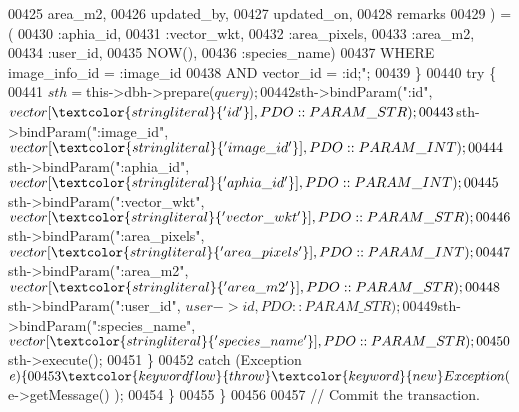 \begin{DoxyCode}
{00425 \textcolor{stringliteral}{                        area\_m2,}
00426 \textcolor{stringliteral}{                        updated\_by,}
00427 \textcolor{stringliteral}{                        updated\_on,}
00428 \textcolor{stringliteral}{                        remarks}
00429 \textcolor{stringliteral}{                    ) = (}
00430 \textcolor{stringliteral}{                        :aphia\_id,}
00431 \textcolor{stringliteral}{                        :vector\_wkt,}
00432 \textcolor{stringliteral}{                        :area\_pixels,}
00433 \textcolor{stringliteral}{                        :area\_m2,}
00434 \textcolor{stringliteral}{                        :user\_id,}
00435 \textcolor{stringliteral}{                        NOW(),}
00436 \textcolor{stringliteral}{                        :species\_name)}
00437 \textcolor{stringliteral}{                    WHERE image\_info\_id = :image\_id}
00438 \textcolor{stringliteral}{                        AND vector\_id = :id;"};
00439             \}
00440             \textcolor{keywordflow}{try} \{
00441                 $sth = $this->dbh->prepare($query);
00442                 $sth->bindParam(\textcolor{stringliteral}{":id"}, $vector[\textcolor{stringliteral}{'id'}], PDO::PARAM\_STR);
00443                 $sth->bindParam(\textcolor{stringliteral}{":image\_id"}, $vector[\textcolor{stringliteral}{'image\_id'}], 
      PDO::PARAM\_INT);
00444                 $sth->bindParam(\textcolor{stringliteral}{":aphia\_id"}, $vector[\textcolor{stringliteral}{'aphia\_id'}], 
      PDO::PARAM\_INT);
00445                 $sth->bindParam(\textcolor{stringliteral}{":vector\_wkt"}, $vector[\textcolor{stringliteral}{'vector\_wkt'}], 
      PDO::PARAM\_STR);
00446                 $sth->bindParam(\textcolor{stringliteral}{":area\_pixels"}, $vector[\textcolor{stringliteral}{'area\_pixels'}], 
      PDO::PARAM\_INT);
00447                 $sth->bindParam(\textcolor{stringliteral}{":area\_m2"}, $vector[\textcolor{stringliteral}{'area\_m2'}], PDO::PARAM\_STR)
      ;
00448                 $sth->bindParam(\textcolor{stringliteral}{":user\_id"}, $user->id, PDO::PARAM\_STR);
00449                 $sth->bindParam(\textcolor{stringliteral}{":species\_name"}, $vector[\textcolor{stringliteral}{'species\_name'}], 
      PDO::PARAM\_STR);
00450                 $sth->execute();
00451             \}
00452             \textcolor{keywordflow}{catch} (Exception $e) \{
00453                 \textcolor{keywordflow}{throw} \textcolor{keyword}{new} Exception( $e->getMessage() );
00454             \}
00455         \}
00456 
00457         \textcolor{comment}{// Commit the transaction.}
}
\end{DoxyCode}
